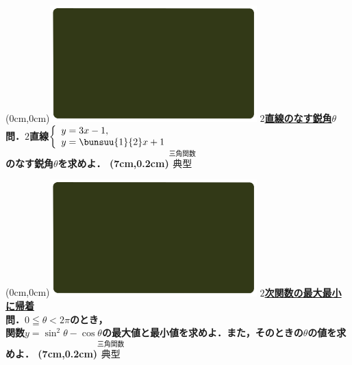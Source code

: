 \documentclass[10pt,
fleqn,
dvipdfmx,
uplatex
]{jsarticle}
\begin{document}
\at(0cm,0cm){\includegraphics[width=8cm,bb=0 0 1920 1080]{./youtube/thumbnails/templates/smart_background/三角関数.jpeg}}
{\color{orange}\bf\boldmath\LARGE\underline{$2$直線のなす鋭角$\theta$}}\vspace{0.3zw}\\
\LARGE 
\bf\boldmath 問．$2$直線$\left\{\begin{array}{l}y=3x-1,\;\\y=\bunsuu{1}{2}x+1\end{array}\right.$\\
のなす鋭角$\theta$を求めよ．
\at(7cm,0.2cm){\small\color{bradorange}$\overset{\text{三角関数}}{\text{典型}}$}

\newpage

\at(0cm,0cm){\includegraphics[width=8cm,bb=0 0 1920 1080]{./youtube/thumbnails/templates/smart_background/三角関数.jpeg}}
{\color{orange}\bf\boldmath\Large\underline{$2$次関数の最大最小に帰着}}\vspace{0.3zw}\\
\Large 
\bf\boldmath 問．$0\leqq \theta <2\pi$のとき，\\関数$y=\sin ^2\theta -\cos \theta$の最大値と最小値を求めよ．また，そのときの$\theta$の値を求めよ．
\at(7cm,0.2cm){\small\color{bradorange}$\overset{\text{三角関数}}{\text{典型}}$}

\newpage
\end{document}
